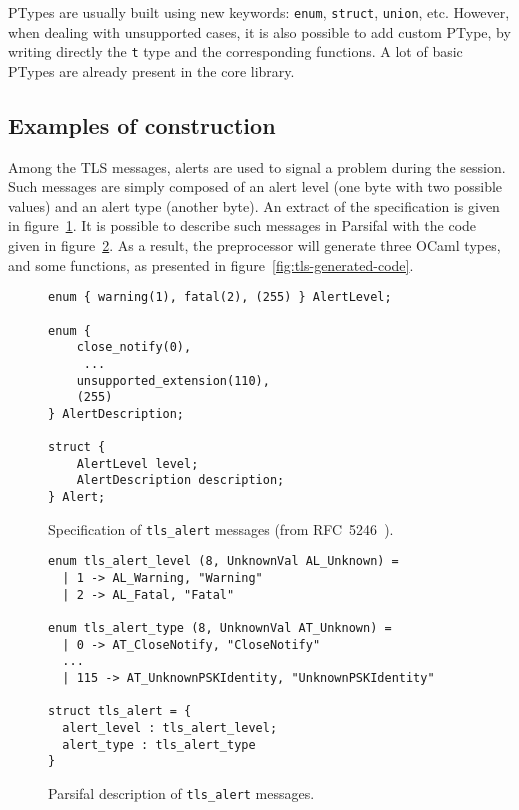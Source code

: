 \documentclass{article}
\begin{document}
PTypes are usually built using new keywords: \texttt{enum},
\texttt{struct}, \texttt{union}, etc. However, when dealing with
unsupported cases, it is also possible to add custom PType, by writing
directly the \texttt{t} type and the corresponding functions. A lot of
basic PTypes are already present in the core library.


\subsection{Examples of construction}

Among the TLS messages, alerts are used to signal a problem during the
session. Such messages are simply composed of an alert level (one byte
with two possible values) and an alert type (another byte). An extract
of the specification is given in figure~\ref{fig:tls-spec}. It is
possible to describe such messages in Parsifal with the code given in
figure~\ref{fig:tls-descr}. As a result, the preprocessor will
generate three OCaml types, and some functions, as presented in
figure~\ref{fig:tls-generated-code}.


\begin{figure}[p]
  \begin{center}\begin{minipage}{.35\linewidth}
    {\scriptsize
    \begin{verbatim}
enum { warning(1), fatal(2), (255) } AlertLevel;

enum {
    close_notify(0),
     ...
    unsupported_extension(110),
    (255)
} AlertDescription;

struct {
    AlertLevel level;
    AlertDescription description;
} Alert;
    \end{verbatim}}
  \end{minipage}\end{center}
  \caption{Specification of \texttt{tls\_alert} messages (from RFC~5246~\cite{rfc5246}).}
  \label{fig:tls-spec}
\end{figure}



\begin{figure}[p]
  \begin{center}\begin{minipage}{.56\linewidth}
    \begin{lstlisting}
enum tls_alert_level (8, UnknownVal AL_Unknown) =
  | 1 -> AL_Warning, "Warning"
  | 2 -> AL_Fatal, "Fatal"

enum tls_alert_type (8, UnknownVal AT_Unknown) =
  | 0 -> AT_CloseNotify, "CloseNotify"
  ...
  | 115 -> AT_UnknownPSKIdentity, "UnknownPSKIdentity"

struct tls_alert = {
  alert_level : tls_alert_level;
  alert_type : tls_alert_type
}
    \end{lstlisting}
  \end{minipage}\end{center}
  \caption{Parsifal description of \texttt{tls\_alert} messages.}
  \label{fig:tls-descr}
\end{figure}
\end{document}
